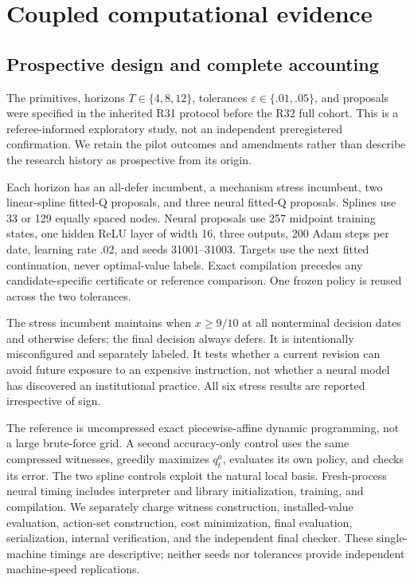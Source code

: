 \section{Coupled computational evidence}\label{sec:results}
\subsection{Prospective design and complete accounting}
The primitives, horizons $T\in\{4,8,12\}$, tolerances $\varepsilon\in\{.01,.05\}$, and proposals were specified in the inherited R31 protocol before the R32 full cohort. This is a referee-informed exploratory study, not an independent preregistered confirmation. We retain the pilot outcomes and amendments rather than describe the research history as prospective from its origin.

Each horizon has an all-defer incumbent, a mechanism stress incumbent, two linear-spline fitted-Q proposals, and three neural fitted-Q proposals. Splines use 33 or 129 equally spaced nodes. Neural proposals use 257 midpoint training states, one hidden ReLU layer of width 16, three outputs, 200 Adam steps per date, learning rate .02, and seeds 31001--31003. Targets use the next fitted continuation, never optimal-value labels. Exact compilation precedes any candidate-specific certificate or reference comparison. One frozen policy is reused across the two tolerances.

The stress incumbent maintains when $x\ge9/10$ at all nonterminal decision dates and otherwise defers; the final decision always defers. It is intentionally misconfigured and separately labeled. It tests whether a current revision can avoid future exposure to an expensive instruction, not whether a neural model has discovered an institutional practice. All six stress results are reported irrespective of sign.

The reference is uncompressed exact piecewise-affine dynamic programming, not a large brute-force grid. A second accuracy-only control uses the same compressed witnesses, greedily maximizes $q_t^a$, evaluates its own policy, and checks its error. The two spline controls exploit the natural local basis. Fresh-process neural timing includes interpreter and library initialization, training, and compilation. We separately charge witness construction, installed-value evaluation, action-set construction, cost minimization, final evaluation, serialization, internal verification, and the independent final checker. These single-machine timings are descriptive; neither seeds nor tolerances provide independent machine-speed replications.


